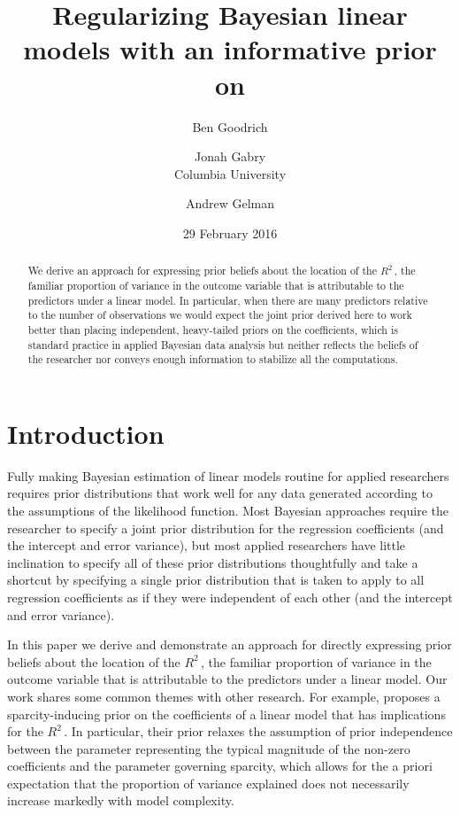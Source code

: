\documentclass[11pt]{article}
\title{\bf Regularizing Bayesian linear models with an informative prior on \Rsq
    \vspace{.1in}}
\author{Ben Goodrich
    \and Jonah Gabry \\[.2in] Columbia University
    \and Andrew Gelman
    \vspace{.1in}}
\date{29 February 2016
    \vspace{-.2in}}
\newcommand{\Rsq}{$R^2\,$}
\begin{document}
\maketitle
\thispagestyle{empty}

\begin{abstract}
\noindent We derive an approach for expressing prior beliefs about the location
of the \Rsq, the familiar proportion of variance in the outcome variable that is
attributable to the predictors under a linear model. In particular, when there
are many predictors relative to the number of observations we would expect the
joint prior derived here to work better than placing independent, heavy-tailed
priors on the coefficients, which is  standard practice in applied Bayesian data
analysis but neither reflects the beliefs of the researcher nor conveys enough
information to stabilize all the computations.
\end{abstract}


\section{Introduction}

Fully making Bayesian estimation of linear models routine for applied
researchers requires prior distributions that work well for any data generated
according to the assumptions of the likelihood function. Most Bayesian
approaches require the researcher to specify a joint prior distribution for the
regression coefficients (and the intercept and error variance), but most applied
researchers have little inclination to specify all of these prior distributions
thoughtfully and take a shortcut by specifying a single prior distribution that
is taken to apply to all regression coefficients as if they were independent of
each other (and the intercept and error variance).

In this paper we derive and demonstrate an approach for directly expressing
prior beliefs about the location of the \Rsq, the familiar proportion of
variance in the outcome variable that is attributable to the predictors under a
linear model. Our work shares some common themes with other research. For
example,  proposes a sparcity-inducing prior on the coefficients of
a linear model that has implications for the \Rsq. In particular, their prior
relaxes the assumption of prior independence between the parameter representing
the typical magnitude of the non-zero coefficients and the parameter governing
sparcity, which allows for the a priori expectation that the proportion of
variance explained does not necessarily increase markedly with model complexity.
\end{document}
